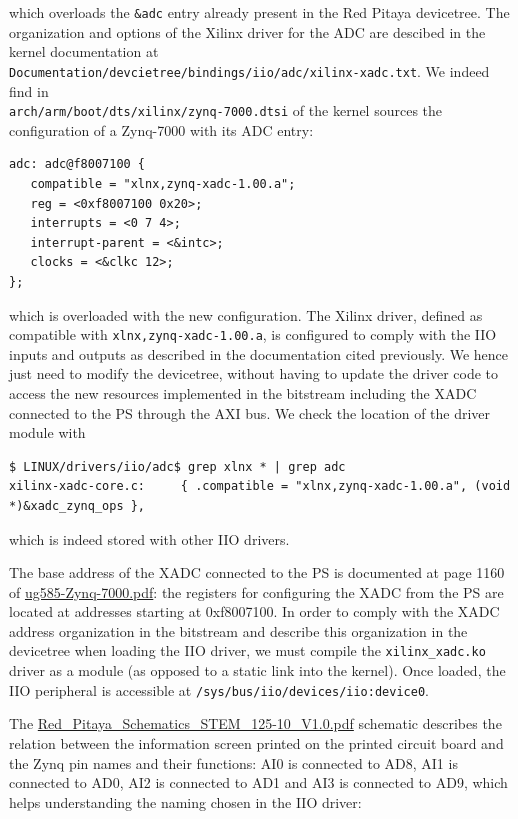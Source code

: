 \documentclass{article}
\begin{document}
{{which overloads the {\tt \&adc} entry already present in the Red Pitaya devicetree. The organization
and options of the Xilinx driver for the ADC are descibed in the kernel documentation at \\
{\tt Documentation/devcietree/bindings/iio/adc/xilinx-xadc.txt}. We indeed find in \\
{\tt arch/arm/boot/dts/xilinx/zynq-7000.dtsi} of the kernel sources the configuration of a Zynq-7000 with
its ADC entry:
\begin{verbatim}
adc: adc@f8007100 {
   compatible = "xlnx,zynq-xadc-1.00.a";
   reg = <0xf8007100 0x20>;
   interrupts = <0 7 4>;
   interrupt-parent = <&intc>;
   clocks = <&clkc 12>;
};
\end{verbatim}
which is overloaded with the new configuration. The Xilinx driver, defined as compatible with 
{\tt xlnx,zynq-xadc-1.00.a}, is configured to comply with the IIO inputs and outputs as described in the documentation 
cited previously. We hence just need to modify the devicetree, without having to update the driver code to access
the new resources implemented in the bitstream including the XADC connected to the PS through the AXI bus. We
check the location of the driver module with
\begin{verbatim}
$ LINUX/drivers/iio/adc$ grep xlnx * | grep adc
xilinx-xadc-core.c:     { .compatible = "xlnx,zynq-xadc-1.00.a", (void *)&xadc_zynq_ops },
\end{verbatim}
which is indeed stored with other IIO drivers.

The base address of the XADC connected to the PS is documented at page 1160 of \url{ug585-Zynq-7000.pdf}: the registers for configuring the XADC from the PS are located at addresses starting at 0xf8007100. In order to comply with the XADC address organization in the bitstream and describe this organization in the devicetree when loading the IIO driver, we must compile the {\tt xilinx\_xadc.ko} driver as a module (as opposed to a static link into the kernel). 
Once loaded, the IIO peripheral is accessible at {\tt /sys/bus/iio/devices/iio:device0}.

The \url{Red_Pitaya_Schematics_STEM_125-10_V1.0.pdf} schematic describes the relation between the information screen printed on the printed circuit board and the Zynq pin names and their functions: AI0 is connected to AD8, AI1 is connected to AD0, AI2 is connected to AD1 and AI3 is connected to AD9, which helps understanding the naming chosen in the IIO driver:

}}
\end{document}
